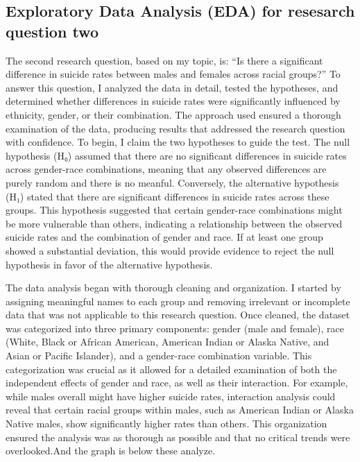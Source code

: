 \documentclass[
  letterpaper,
  DIV=11,
  numbers=noendperiod]{scrartcl}
\begin{document}
\subsection{Exploratory Data Analysis (EDA) for resesarch question
two}\label{exploratory-data-analysis-eda-for-resesarch-question-two}

The second research question, based on my topic, is: ``Is there a
significant difference in suicide rates between males and females across
racial groups?'' To answer this question, I analyzed the data in detail,
tested the hypotheses, and determined whether differences in suicide
rates were significantly influenced by ethnicity, gender, or their
combination. The approach used ensured a thorough examination of the
data, producing results that addressed the research question with
confidence. To begin, I claim the two hypotheses to guide the test. The
null hypothesis (H₀) assumed that there are no significant differences
in suicide rates across gender-race combinations, meaning that any
observed differences are purely random and there is no meanful.
Conversely, the alternative hypothesis (H₁) stated that there are
significant differences in suicide rates across these groups. This
hypothesis suggested that certain gender-race combinations might be more
vulnerable than others, indicating a relationship between the observed
suicide rates and the combination of gender and race. If at least one
group showed a substantial deviation, this would provide evidence to
reject the null hypothesis in favor of the alternative hypothesis.

The data analysis began with thorough cleaning and organization. I
started by assigning meaningful names to each group and removing
irrelevant or incomplete data that was not applicable to this research
question. Once cleaned, the dataset was categorized into three primary
components: gender (male and female), race (White, Black or African
American, American Indian or Alaska Native, and Asian or Pacific
Islander), and a gender-race combination variable. This categorization
was crucial as it allowed for a detailed examination of both the
independent effects of gender and race, as well as their interaction.
For example, while males overall might have higher suicide rates,
interaction analysis could reveal that certain racial groups within
males, such as American Indian or Alaska Native males, show
significantly higher rates than others. This organization ensured the
analysis was as thorough as possible and that no critical trends were
overlooked.And the graph is below these analyze.
\end{document}
